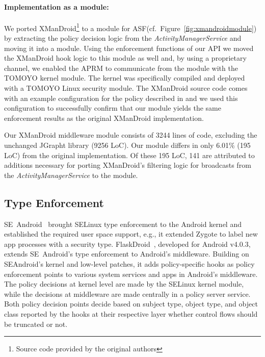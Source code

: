 \documentclass[letterpaper,twocolumn,10pt]{article}
\newcommand{\OURSHORT}{\textsc{ASF}\xspace}
\begin{document}
\paragraph{Implementation as a module:} We ported XManDroid\footnote{Source code provided by the original authors} to a module for \OURSHORT (cf.~Figure~\ref{fig:xmandroidmodule}) by extracting the policy decision logic from the \textit{ActivityManagerService} and moving it into a module. Using the enforcement functions of our API we moved the XManDroid hook logic to this module as well and, by using a proprietary channel, we enabled the APRM to communicate from the module with the TOMOYO kernel module. The kernel was specifically compiled and deployed with a TOMOYO Linux security module. The XManDroid source code comes with an example configuration for the policy described in \cite{BuDaDm_12:TowardsT} and we used this configuration to successfully confirm that our module yields the same enforcement results as the original XManDroid implementation.

Our XManDroid middleware module consists of 3244 lines of code, excluding the unchanged JGrapht library (9256 LoC). Our module differs in only 6.01\% (195 LoC) from the original implementation. Of these 195 LoC, 141 are attributed to additions necessary for porting XManDroid's filtering logic for broadcasts from the \textit{ActivityManagerService} to the module.


\subsection{Type Enforcement~\cite{Smalley2013,TUD-CS-2013-0115}}
\label{sec:usecase:flaskdroid}

SE~Android~\cite{Smalley2013} brought SELinux type enforcement to the Android kernel and established the required user space support, e.g., it extended Zygote to label new app processes with a security type. FlaskDroid~\cite{TUD-CS-2013-0115}, developed for Android v4.0.3, extends SE~Android's type enforcement to Android's middleware. Building on SEAndroid's kernel and low-level patches, it adds policy-specific hooks as policy enforcement points to various system services and apps in Android's middleware. The policy decisions at kernel level are made by the SELinux kernel module, while the decisions at middleware are made centrally in a policy server service. Both policy decision points decide based on subject type, object type, and object class reported by the hooks at their respective layer whether control flows should be truncated or not.
\end{document}
